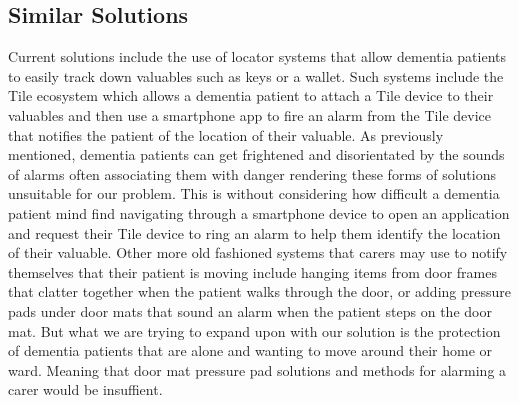     \subsection{Similar Solutions}
        Current solutions include the use of locator systems that allow dementia patients to easily track down valuables such as keys or a wallet. Such systems include the Tile ecosystem which allows a dementia patient to attach a Tile device to their valuables and then use a smartphone app to fire an alarm from the Tile device that notifies the patient of the location of their valuable. As previously mentioned, dementia patients can get frightened and disorientated by the sounds of alarms often associating them with danger rendering these forms of solutions unsuitable for our problem. This is without considering how difficult a dementia patient mind find navigating through a smartphone device to open an application and request their Tile device to ring an alarm to help them identify the location of their valuable. Other more old fashioned systems that carers may use to notify themselves that their patient is moving include hanging items from door frames that clatter together when the patient walks through the door, or adding pressure pads under door mats that sound an alarm when the patient steps on the door mat. But what we are trying to expand upon with our solution is the protection of dementia patients that are alone and wanting to move around their home or ward. Meaning that door mat pressure pad solutions and methods for alarming a carer would be insuffient.

